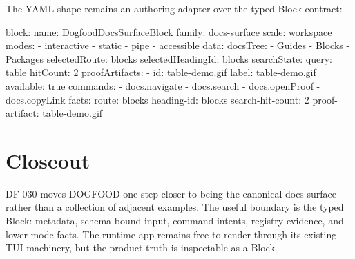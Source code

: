 The YAML shape remains an authoring adapter over the typed Block contract:

\begin{CodeBlock}
block:
  name: DogfoodDocsSurfaceBlock
  family: docs-surface
  scale: workspace
  modes:
    - interactive
    - static
    - pipe
    - accessible
data:
  docsTree:
    - Guides
    - Blocks
    - Packages
  selectedRoute: blocks
  selectedHeadingId: blocks
  searchState:
    query: table
    hitCount: 2
  proofArtifacts:
    - id: table-demo.gif
      label: table-demo.gif
      available: true
commands:
  - docs.navigate
  - docs.search
  - docs.openProof
  - docs.copyLink
facts:
  route: blocks
  heading-id: blocks
  search-hit-count: 2
  proof-artifact: table-demo.gif
\end{CodeBlock}

\section{Closeout}\label{record-091-closeout}

DF-030 moves DOGFOOD one step closer to being the canonical docs surface rather than a collection of adjacent examples. The useful boundary is the typed Block: metadata, schema-bound input, command intents, registry evidence, and lower-mode facts. The runtime app remains free to render through its existing TUI machinery, but the product truth is inspectable as a Block.

